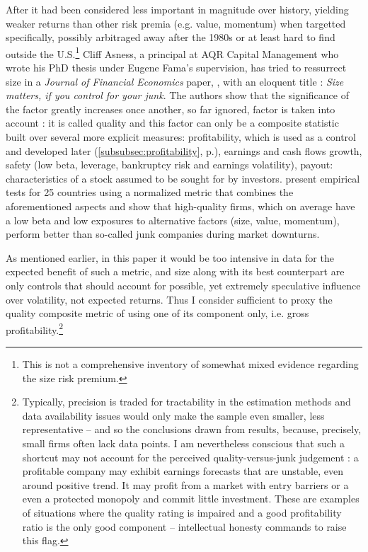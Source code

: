 After it had been considered less important in magnitude over history, yielding weaker returns than other risk premia (e.g. value, momentum) when targetted specifically, possibly arbitraged away after the 1980s or at least hard to find outside the U.S.\footnote{This is not a comprehensive inventory of somewhat mixed evidence regarding the size risk premium.} Cliff Asness, a principal at AQR Capital Management who wrote his PhD thesis under Eugene Fama's supervision, has tried to ressurrect size in a \emph{Journal of Financial Economics} paper, \textcite{Asness2018}, with an eloquent title : \emph{Size matters, if you control for your junk}. The authors show that the significance of the factor greatly increases once another, so far ignored, factor is taken into account : it is called quality and this factor can only be a composite statistic built over several more explicit measures: profitability, which is used as a control and developed later (\autoref{subsubsec:profitability}, p.\pageref{subsubsec:profitability}), earnings and cash flows growth, safety (low beta, leverage, bankruptcy risk and earnings volatility), payout: characteristics of a stock assumed to be sought for by investors. \textcite{Asness2019} present empirical tests for 25 countries using a normalized metric that combines the aforementioned aspects and show that high-quality firms, which on average have a low beta and low exposures to alternative factors (size, value, momentum), perform better than so-called junk companies during market downturns.

As mentioned earlier, in this paper it would be too intensive in data for the expected benefit of such a metric, and size along with its best counterpart are only controls that should account for possible, yet extremely speculative influence over volatility, not expected returns. Thus I consider sufficient to proxy the quality composite metric of \textcite{Asness2018} using one of its component only, i.e. gross profitability.\footnote{Typically, precision is traded for tractability in the estimation methods and data availability issues would only make the sample even smaller, less representative -- and so the conclusions drawn from results, because, precisely, small firms often lack data points. I am nevertheless conscious that such a shortcut may not account for the perceived quality-versus-junk judgement : a profitable company may exhibit earnings forecasts that are unstable, even around positive trend. It may profit from a market with entry barriers or a even a protected monopoly and commit little investment. These are examples of situations where the quality rating is impaired and a good profitability ratio is the only good component -- intellectual honesty commands to raise this flag.}
